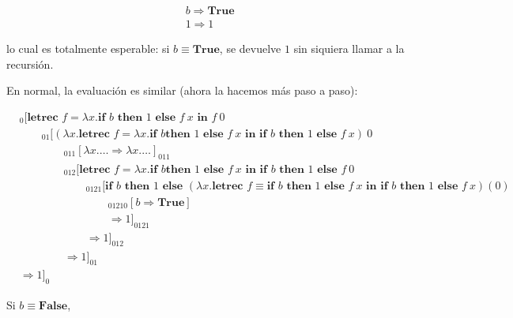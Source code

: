 \documentclass[article, 12pt]{article}
\begin{document}
\begin{align*}
&b \Rightarrow \textbf{True} \\ 
&1 \Rightarrow 1 
\end{align*}

lo cual es totalmente esperable: si $b \equiv \textbf{True}$, se devuelve $1$
sin siquiera llamar a la recursión.

\pagebreak 

En normal, la evaluación es similar (ahora la hacemos más paso a paso):

\footnotesize

\begin{align*}
&_0[\textbf{letrec } f = \lambda x. 
\textbf{if } b \textbf{ then } 1 \textbf{    else } f ~ x \textbf{ in } f~0 \\ 
&\qquad _{01}[(\lambda x. \textbf{letrec } f = \lambda x.\textbf{if } b \textbf{
then } 1 \textbf{    else } f ~ x \textbf{ in }\textbf{if } b \textbf{ then } 1
\textbf{    else } f ~ x ) ~ 0 \\ 
&\qquad \qquad_{011}[\lambda x. \ldots \Rightarrow \lambda x. \ldots]_{011} \\ 
&\qquad \qquad _{012}[\textbf{letrec } f = \lambda x.\textbf{if } b \textbf{
then } 1 \textbf{    else } f ~ x \textbf{ in } \textbf{if } b \textbf{ then } 1
\textbf{    else } f ~ 0 \\ 
&\qquad\qquad\qquad _{0121}[
\textbf{if } b \textbf{ then } 1 \textbf{    else } (\lambda x.\textbf{letrec } f \equiv\textbf{if } b \textbf{ then } 1 \textbf{ else } f ~ x \textbf{ in } \textbf{if } b \textbf{ then } 1 \textbf{    else } f
~ x)(0) \\ 
&\qquad\qquad\qquad\qquad _{01210}[b \Rightarrow \textbf{True}]\\
&\qquad\qquad\qquad\qquad \Rightarrow  1]_{0121} \\ 
&\qquad \qquad \qquad \Rightarrow 1 ]_{012} \\ 
&\qquad\qquad \Rightarrow 1]_{01} \\ 
&\Rightarrow 1]_0
\end{align*}

Si $b \equiv \textbf{False}$,
\end{document}
